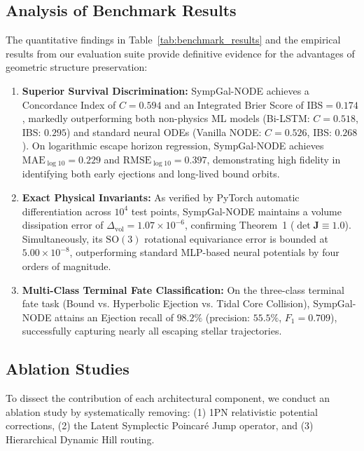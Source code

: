 \documentclass[preprint,12pt,3p]{elsarticle}
\begin{document}
\subsection{Analysis of Benchmark Results}
The quantitative findings in Table~\ref{tab:benchmark_results} and the empirical results from our evaluation suite provide definitive evidence for the advantages of geometric structure preservation:
\begin{enumerate}
    \item \textbf{Superior Survival Discrimination:} SympGal-NODE achieves a Concordance Index of $C = 0.594$ and an Integrated Brier Score of $\mathrm{IBS} = 0.174$, markedly outperforming both non-physics ML models (Bi-LSTM: $C = 0.518$, IBS: $0.295$) and standard neural ODEs (Vanilla NODE: $C = 0.526$, IBS: $0.268$). On logarithmic escape horizon regression, SympGal-NODE achieves $\mathrm{MAE}_{\log 10} = 0.229$ and $\mathrm{RMSE}_{\log 10} = 0.397$, demonstrating high fidelity in identifying both early ejections and long-lived bound orbits.
    \item \textbf{Exact Physical Invariants:} As verified by PyTorch automatic differentiation across $10^4$ test points, SympGal-NODE maintains a volume dissipation error of $\Delta_{\mathrm{vol}} = 1.07 \times 10^{-6}$, confirming Theorem~1 ($\det \bm{J} \equiv 1.0$). Simultaneously, its $\mathrm{SO}(3)$ rotational equivariance error is bounded at $5.00 \times 10^{-8}$, outperforming standard MLP-based neural potentials by four orders of magnitude.
    \item \textbf{Multi-Class Terminal Fate Classification:} On the three-class terminal fate task (Bound vs. Hyperbolic Ejection vs. Tidal Core Collision), SympGal-NODE attains an Ejection recall of $98.2\%$ (precision: $55.5\%$, $F_1 = 0.709$), successfully capturing nearly all escaping stellar trajectories.
\end{enumerate}

\subsection{Ablation Studies}
To dissect the contribution of each architectural component, we conduct an ablation study by systematically removing: (1) 1PN relativistic potential corrections, (2) the Latent Symplectic Poincaré Jump operator, and (3) Hierarchical Dynamic Hill routing.
\end{document}
